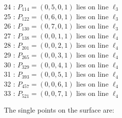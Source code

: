 \documentclass{article}
\begin{document}
{\begin{multicols}{2}
24 : $P_{114}=( 0, 5, 0, 1 )$ lies on line $\ell_{3}$\\
25 : $P_{122}=( 0, 6, 0, 1 )$ lies on line $\ell_{3}$\\
26 : $P_{130}=( 0, 7, 0, 1 )$ lies on line $\ell_{3}$\\
27 : $P_{138}=( 0, 0, 1, 1 )$ lies on line $\ell_{4}$\\
28 : $P_{201}=( 0, 0, 2, 1 )$ lies on line $\ell_{4}$\\
29 : $P_{265}=( 0, 0, 3, 1 )$ lies on line $\ell_{4}$\\
30 : $P_{329}=( 0, 0, 4, 1 )$ lies on line $\ell_{4}$\\
31 : $P_{393}=( 0, 0, 5, 1 )$ lies on line $\ell_{4}$\\
32 : $P_{457}=( 0, 0, 6, 1 )$ lies on line $\ell_{4}$\\
33 : $P_{521}=( 0, 0, 7, 1 )$ lies on line $\ell_{4}$\\
\end{multicols}
The single points on the surface are:\\
}
\end{document}
